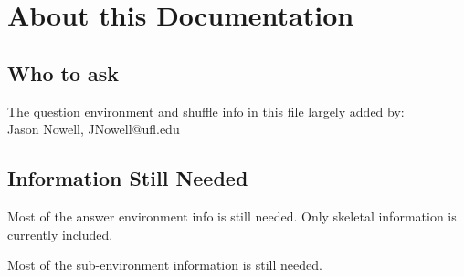 \documentclass{ximera}
\begin{document}
\newcommand{\TestII}{10}
\setcounter{TestII}{10}

\newcommand{\TestIII}{1}
\setcounter{TestIII}{1}



\newpage
\section{About this Documentation}
\subsection{Who to ask}
The question environment and shuffle info in this file largely added by:\\
Jason Nowell, JNowell@ufl.edu\\


\subsection{Information Still Needed}
Most of the answer environment info is still needed. Only skeletal information is currently included.

Most of the sub-environment information is still needed.
\end{document}
